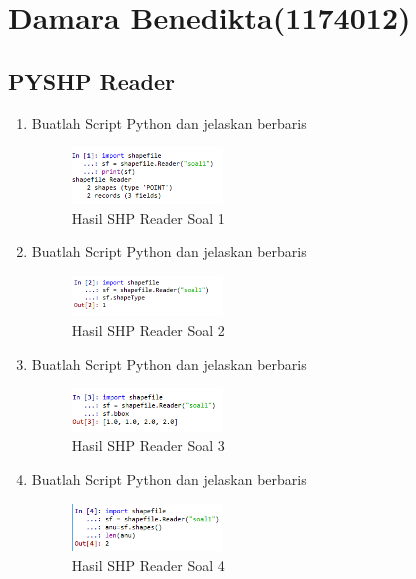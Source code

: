 \section{Damara Benedikta(1174012)}
\subsection{PYSHP Reader}
\begin{enumerate}
    \item Buatlah Script Python dan jelaskan berbaris
    
    \hfill\break
    \begin{figure}[H]
		\includegraphics[width=4cm]{figures/1174012/3/1.png}
		\centering
		\caption{Hasil SHP Reader Soal 1}
    \end{figure}
    
    \item Buatlah Script Python dan jelaskan berbaris
    
    \hfill\break
    \begin{figure}[H]
		\includegraphics[width=4cm]{figures/1174012/3/2.png}
		\centering
		\caption{Hasil SHP Reader Soal 2}
    \end{figure}
    
    \item Buatlah Script Python dan jelaskan berbaris
    
    \hfill\break
    \begin{figure}[H]
		\includegraphics[width=4cm]{figures/1174012/3/3.png}
		\centering
		\caption{Hasil SHP Reader Soal 3}
    \end{figure}
    
    \item Buatlah Script Python dan jelaskan berbaris
    
    \hfill\break
    \begin{figure}[H]
		\includegraphics[width=4cm]{figures/1174012/3/4.png}
		\centering
		\caption{Hasil SHP Reader Soal 4}
    \end{figure}
    

\end{enumerate}

